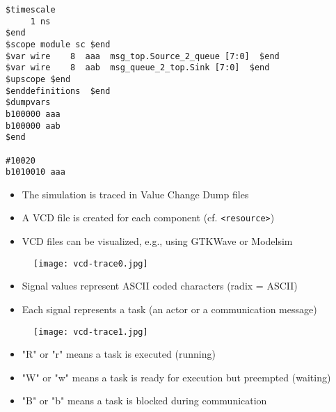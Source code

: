 \begin{frame}[fragile=singleslide]
\begin{lstlisting}
$timescale
     1 ns
$end
$scope module sc $end
$var wire    8  aaa  msg_top.Source_2_queue [7:0]  $end
$var wire    8  aab  msg_queue_2_top.Sink [7:0]  $end
$upscope $end
$enddefinitions  $end
$dumpvars
b100000 aaa
b100000 aab
$end

#10020
b1010010 aaa
\end{lstlisting}
\begin{itemize}
\item The simulation is traced in Value Change Dump files
\item A VCD file is created for each component (cf. \lstinline!<resource>!)
\item VCD files can be visualized, e.g., using GTKWave or Modelsim
\end{itemize}
\end{frame}


\begin{frame}[t]
\begin{figure}
\centering
\texttt{[image: vcd-trace0.jpg]}
\end{figure}

\begin{itemize}
\item Signal values represent ASCII coded characters (radix = ASCII)
\item Each signal represents a task (an actor or a communication message)
\end{itemize}

\end{frame}


\begin{frame}[t]
\begin{figure}
\centering
\texttt{[image: vcd-trace1.jpg]}
\end{figure}

\begin{itemize}
\item "R" or "r" means a task is executed (running)
\item "W" or "w" means a task is ready for execution but preempted (waiting)
\item "B" or "b" means a task is blocked during communication
\end{itemize}

\end{frame}


